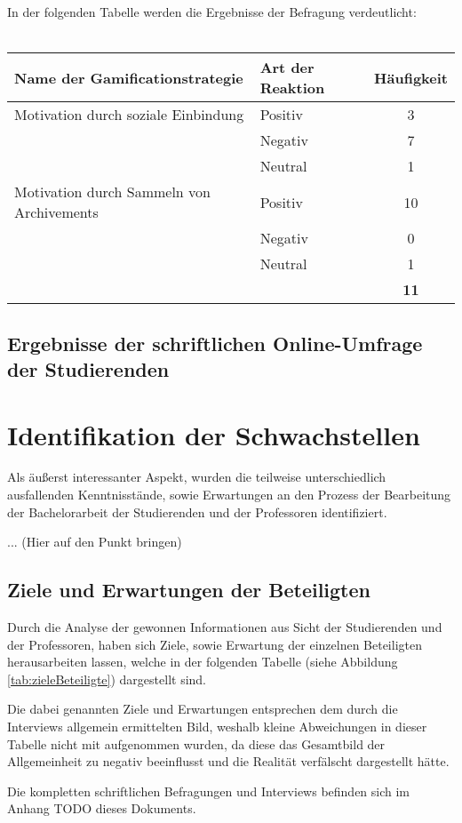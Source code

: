 \documentclass{scrreprt}
\begin{document}
\par In der folgenden Tabelle werden die Ergebnisse der Befragung verdeutlicht:\\\\


\begin{tabularx}{\textwidth}{l|l|c}
	\hline
	\textbf{Name der Gamificationstrategie} & \textbf{Art der Reaktion} & 
	\textbf{Häufigkeit} \\ \hline
	Motivation durch soziale Einbindung & Positiv & 3 \\
	& Negativ & 7 \\
	& Neutral & 1 \\ \hline
	Motivation durch Sammeln von Archivements & Positiv & 10 \\
	& Negativ & 0 \\
	& Neutral & 1 \\ \hline
	&  & \textbf{11} \\
\end{tabularx}
\label{tab:einbezugStudierende}

\subsection{Ergebnisse der schriftlichen Online-Umfrage der Studierenden}

\newpage
\section{Identifikation der Schwachstellen}
\par Als äußerst interessanter Aspekt, wurden die teilweise unterschiedlich ausfallenden Kenntnisstände, sowie Erwartungen an den Prozess der Bearbeitung der Bachelorarbeit der Studierenden und der Professoren identifiziert.

... (Hier auf den Punkt bringen)

\subsection{Ziele und Erwartungen der Beteiligten}
\par Durch die Analyse der gewonnen Informationen aus Sicht der Studierenden und der Professoren, haben sich Ziele, sowie Erwartung der einzelnen Beteiligten herausarbeiten lassen, welche in der folgenden Tabelle (siehe Abbildung \ref{tab:zieleBeteiligte}) dargestellt sind.
\par Die dabei genannten Ziele und Erwartungen entsprechen dem durch die Interviews allgemein ermittelten Bild, weshalb kleine Abweichungen in dieser Tabelle nicht mit aufgenommen wurden, da diese das Gesamtbild der Allgemeinheit zu negativ beeinflusst und die Realität verfälscht dargestellt hätte.\\
\par Die kompletten schriftlichen Befragungen und Interviews befinden sich im Anhang TODO dieses Dokuments.\\
\end{document}
